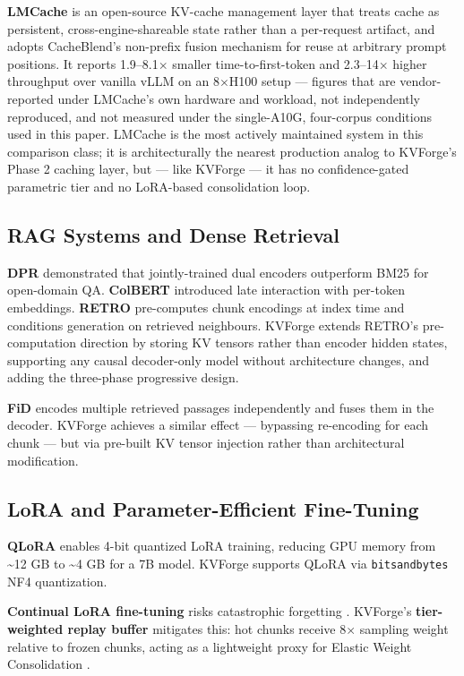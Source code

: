 \documentclass[10pt,twocolumn]{article}
\begin{document}
\textbf{LMCache} \cite{ref33} is an open-source KV-cache management layer that treats cache as persistent, cross-engine-shareable state rather than a per-request artifact, and adopts CacheBlend's non-prefix fusion mechanism for reuse at arbitrary prompt positions. It reports 1.9--8.1$\times$ smaller time-to-first-token and 2.3--14$\times$ higher throughput over vanilla vLLM on an 8$\times$H100 setup --- figures that are vendor-reported under LMCache's own hardware and workload, not independently reproduced, and not measured under the single-A10G, four-corpus conditions used in this paper. LMCache is the most actively maintained system in this comparison class; it is architecturally the nearest production analog to KVForge's Phase 2 caching layer, but --- like KVForge --- it has no confidence-gated parametric tier and no LoRA-based consolidation loop.


\subsection{RAG Systems and Dense Retrieval}

\textbf{DPR} \cite{ref5} demonstrated that jointly-trained dual encoders outperform BM25 for open-domain QA. \textbf{ColBERT} \cite{ref17} introduced late interaction with per-token embeddings. \textbf{RETRO} \cite{ref8} pre-computes chunk encodings at index time and conditions generation on retrieved neighbours. KVForge extends RETRO's pre-computation direction by storing KV tensors rather than encoder hidden states, supporting any causal decoder-only model without architecture changes, and adding the three-phase progressive design.


\textbf{FiD} \cite{ref21} encodes multiple retrieved passages independently and fuses them in the decoder. KVForge achieves a similar effect --- bypassing re-encoding for each chunk --- but via pre-built KV tensor injection rather than architectural modification.


\subsection{LoRA and Parameter-Efficient Fine-Tuning}

\textbf{QLoRA} \cite{ref9} enables 4-bit quantized LoRA training, reducing GPU memory from \textasciitilde{}12 GB to \textasciitilde{}4 GB for a 7B model. KVForge supports QLoRA via \texttt{bitsandbytes} NF4 quantization.


\textbf{Continual LoRA fine-tuning} risks catastrophic forgetting \cite{ref13}. KVForge's \textbf{tier-weighted replay buffer} mitigates this: hot chunks receive 8$\times$ sampling weight relative to frozen chunks, acting as a lightweight proxy for Elastic Weight Consolidation \cite{ref22}.
\end{document}
